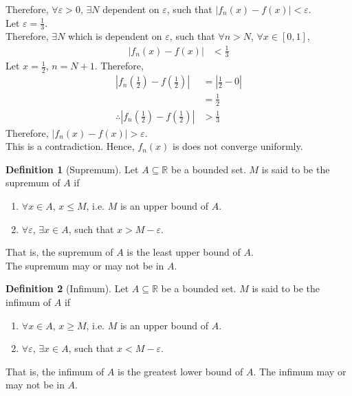 \documentclass[fleqn, a4paper, 12pt, twoside]{article}
\theoremstyle{definition}
\newtheorem{definition}{Definition}
\theoremstyle{theorem}
\begin{document}
{\begin{solution}
	Therefore, $\forall \varepsilon > 0$, $\exists N$ dependent on $\varepsilon$, such that $|f_n(x) - f(x)| < \varepsilon$.\\
	Let $\varepsilon = \frac{1}{3}$.\\
	Therefore, $\exists N$ which is dependent on $\varepsilon$, such that $\forall n > N$, $\forall x \in [0,1]$,
	\begin{align*}
		|f_n(x) - f(x)| &< \frac{1}{3}
	\end{align*}
	Let $x = \frac{1}{2}$, $n = N + 1$.
	Therefore,
	\begin{align*}
		\left| f_n \left( \frac{1}{2} \right) - f \left( \frac{1}{2} \right) \right| &= \left| \frac{1}{2} - 0 \right|\\
		&= \frac{1}{2}\\
		\therefore \left| f_n \left( \frac{1}{2} \right) - f \left( \frac{1}{2} \right) \right| &> \frac{1}{3}
	\end{align*}
	Therefore, $|f_n(x) - f(x)| > \varepsilon$.\\
	This is a contradiction.
	Hence, $f_n(x)$ is does not converge uniformly.
\end{solution}

\begin{definition}[Supremum]
	Let $A \subseteq \mathbb{R}$ be a bounded set.
	$M$ is said to be the supremum of $A$ if
	\begin{enumerate}
		\item $\forall x \in A$, $x \le M$, i.e. $M$ is an upper bound of $A$.
		\item $\forall \varepsilon$, $\exists x \in A$, such that $x > M - \varepsilon$.
	\end{enumerate}
	That is, the supremum of $A$ is the least upper bound of $A$.\\
	The supremum may or may not be in $A$.
\end{definition}

\begin{definition}[Infimum]
	Let $A \subseteq \mathbb{R}$ be a bounded set.
	$M$ is said to be the infimum of $A$ if
	\begin{enumerate}
		\item $\forall x \in A$, $x \ge M$, i.e. $M$ is an upper bound of $A$.
		\item $\forall \varepsilon$, $\exists x \in A$, such that $x < M - \varepsilon$.
	\end{enumerate}
	That is, the infimum of $A$ is the greatest lower bound of $A$.
	The infimum may or may not be in $A$.
\end{definition}

}
\end{document}
